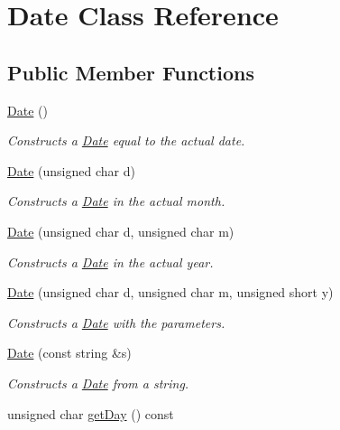 \hypertarget{classDate}{}\section{Date Class Reference}
\label{classDate}
\subsection*{Public Member Functions}
\begin{DoxyCompactItemize}
\item 
\mbox{\label{classDate_a4e59ed4ba66eec61c27460c5d09fa1bd}} 
\hyperlink{classDate_a4e59ed4ba66eec61c27460c5d09fa1bd}{Date} ()
\begin{DoxyCompactList}\small\item\em Constructs a \hyperlink{classDate}{Date} equal to the actual date. \end{DoxyCompactList}\item 
\hyperlink{classDate_a4a6868a4db32c63f53aad84d794be0d3}{Date} (unsigned char d)
\begin{DoxyCompactList}\small\item\em Constructs a \hyperlink{classDate}{Date} in the actual month. \end{DoxyCompactList}\item 
\hyperlink{classDate_a63d4a68d83a800750818af927c1d4bdd}{Date} (unsigned char d, unsigned char m)
\begin{DoxyCompactList}\small\item\em Constructs a \hyperlink{classDate}{Date} in the actual year. \end{DoxyCompactList}\item 
\hyperlink{classDate_a08834516438a2776903c7e9246ae6a4e}{Date} (unsigned char d, unsigned char m, unsigned short y)
\begin{DoxyCompactList}\small\item\em Constructs a \hyperlink{classDate}{Date} with the parameters. \end{DoxyCompactList}\item 
\hyperlink{classDate_a26c608981ab41cc6f33711cb404012e3}{Date} (const string \&s)
\begin{DoxyCompactList}\small\item\em Constructs a \hyperlink{classDate}{Date} from a string. \end{DoxyCompactList}\item 
unsigned char \hyperlink{classDate_aa8b655b2dcc970220dc1764a86836a90}{get\+Day} () const

\end{DoxyCompactItemize}
